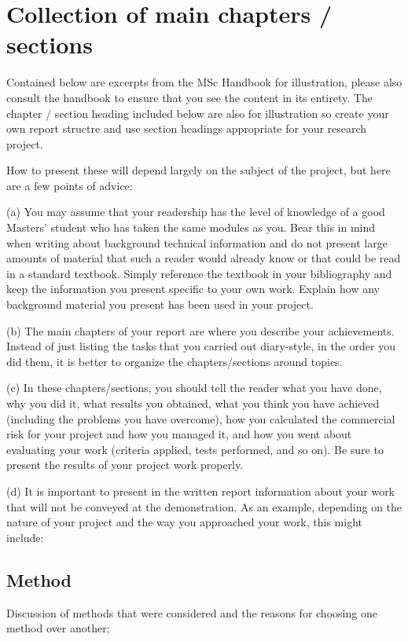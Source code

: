 \documentclass[a4paper, notitlepage, 11pt]{article}
\begin{document}
\section{Collection of main chapters / sections}

Contained below are excerpts from the MSc Handbook for illustration, please also consult the handbook to ensure that you see the content in its entirety.  The chapter / section heading included below are also for illustration so create your own report structre and use section headings appropriate for your research project.

How to present these will depend largely on the subject of the project, but here are a few points of advice: 

(a) You  may  assume  that  your  readership  has  the  level  of  knowledge  of  a  good  Masters’ student  who  has  taken  the  same  modules  as  you.  Bear  this  in  mind  when  writing  about background  technical  information  and  do  not  present  large  amounts  of  material  that  such  a reader would already know or that could be read in a standard textbook. Simply reference the textbook in your bibliography and keep the information you present specific to your own work. Explain how any background material you present has been used in your project.  

(b) The main  chapters of your report are where you describe your achievements. Instead of just listing the tasks that you carried out diary-style, in the order you did them, it is better to organize the chapters/sections around topics.  

(c) In  these  chapters/sections,  you  should  tell  the  reader  what  you  have  done,  why  you  did  it,  what results  you  obtained,  what  you  think  you  have  achieved  (including  the  problems  you  have overcome), how you calculated the commercial risk for your project and how you managed it, and how you went about evaluating your work (criteria applied, tests performed, and so on). Be sure to present the results of your project work properly.  

(d) It is important to present in the written report information about your work that will not be conveyed at the demonstration. As an example, depending on the nature of your project and the way you approached your work, this might include:  
\subsection{Method}
Discussion of methods that were considered and the reasons for choosing one method 
over another;  
\end{document}
